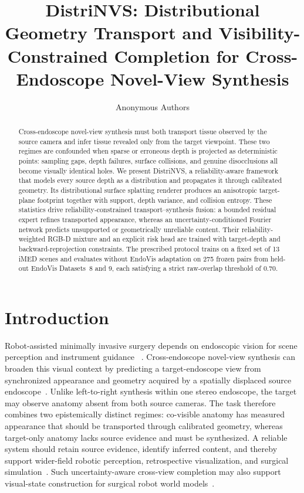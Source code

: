 \documentclass[letterpaper,10pt,conference]{ieeeconf}
\title{\LARGE \bf
DistriNVS: Distributional Geometry Transport and Visibility-Constrained Completion for Cross-Endoscope Novel-View Synthesis}
\author{Anonymous Authors}
\begin{document}
\maketitle
\thispagestyle{empty}
\pagestyle{empty}

\begin{abstract}
Cross-endoscope novel-view synthesis must both transport tissue observed by
the source camera and infer tissue revealed only from the target viewpoint.
These two regimes are confounded when sparse or erroneous depth is projected
as deterministic points: sampling gaps, depth failures, surface collisions,
and genuine disocclusions all become visually identical holes. We present
DistriNVS, a reliability-aware framework that models every source depth as a
distribution and propagates it through calibrated geometry. Its
distributional surface splatting renderer produces an anisotropic target-plane
footprint together with support, depth variance, and collision entropy. These
statistics drive reliability-constrained transport--synthesis fusion: a bounded
residual expert refines transported appearance, whereas an
uncertainty-conditioned Fourier network predicts unsupported or geometrically
unreliable content. Their reliability-weighted RGB-D mixture and an explicit
risk head are trained with target-depth and backward-reprojection constraints.
The prescribed protocol trains on a fixed set of 13 iMED scenes and evaluates
without EndoVis adaptation on 275 frozen pairs from held-out EndoVis
Datasets~8 and 9, each satisfying a strict raw-overlap threshold of 0.70.
\end{abstract}

\section{Introduction}
\label{sec:introduction}

Robot-assisted minimally invasive surgery depends on endoscopic vision for
scene perception and instrument guidance
~\cite{wei2026roboticperception,sunmola2026surgicalgaussiansurfels}.
Cross-endoscope novel-view synthesis can broaden this visual context by
predicting a target-endoscope view from synchronized appearance and geometry
acquired by a spatially displaced source endoscope~\cite{wang2026endoe2egs}.
Unlike left-to-right synthesis within one stereo endoscope, the target may
observe anatomy absent from both source cameras. The task therefore combines
two epistemically distinct regimes: co-visible anatomy has measured appearance
that should be transported through calibrated geometry, whereas target-only
anatomy lacks source evidence and must be synthesized. A reliable system should
retain source evidence, identify inferred content, and thereby support
wider-field robotic perception, retrospective visualization, and surgical
simulation~\cite{hsieh2026extrags}.
Such uncertainty-aware cross-view completion may also support visual-state
construction for surgical robot world models~\cite{he2025surgworld}.
\end{document}
